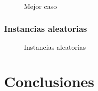\documentclass[a4paper, 10pt, twoside]{article}
\newcommand{\tresgraficos}[3]{
    \newcommand{\separacion}{-2.2em}
    \vspace{\separacion}
    
    \vspace{\separacion}
    
    \vspace{\separacion}
    
}
\begin{document}
\begin{figure}[H]
  \centering
  \tresgraficos{problema3-mejor-caso}
               {problema3-mejor-caso-logn}
               {problema3-mejor-caso-n}
  \caption{Mejor caso}
\end{figure}


\subsubsection{Instancias aleatorias}

\begin{figure}[H]
  \centering
  \tresgraficos{problema3-instancias-aleatorias}
               {problema3-instancias-aleatorias-logn}
               {problema3-instancias-aleatorias-n}
  \caption{Instancias aleatorias}
\end{figure}




\newpage

\section{Conclusiones}






\newpage
\end{document}
